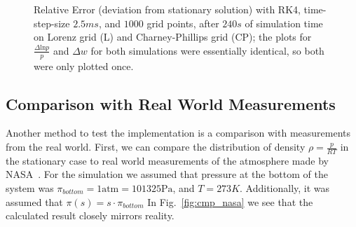 \begin{figure}[!h]
    \caption{Relative Error (deviation from stationary solution) with RK4, time-step-size $2.5ms$, and $1000$ grid points, after $240s$ of simulation time on Lorenz grid (L) and Charney-Phillips grid (CP);
    the plots for $\frac{\Delta \text{ln}p}{p}$ and $\Delta w$ for both simulations were essentially identical, so both were only plotted once.}

    \label{fig:lorenz_stat_err}
    
\end{figure}

\subsection{Comparison with Real World Measurements}
Another method to test the implementation is a comparison with measurements from the real world.
First, we can compare the distribution of density $\rho=\frac{p}{RT}$ in the stationary case to real world measurements of the atmosphere made by NASA~\cite{larson1963stratosphere}.
For the simulation we assumed that pressure at the bottom of the system was $\pi_{bottom}=1\text{atm}=101325 \text{Pa}$, and $T=273K$.
Additionally, it was assumed that $\pi (s) = s\cdot\pi_{bottom}$
In Fig.~\ref{fig:cmp_nasa} we see that the calculated result closely mirrors reality.



